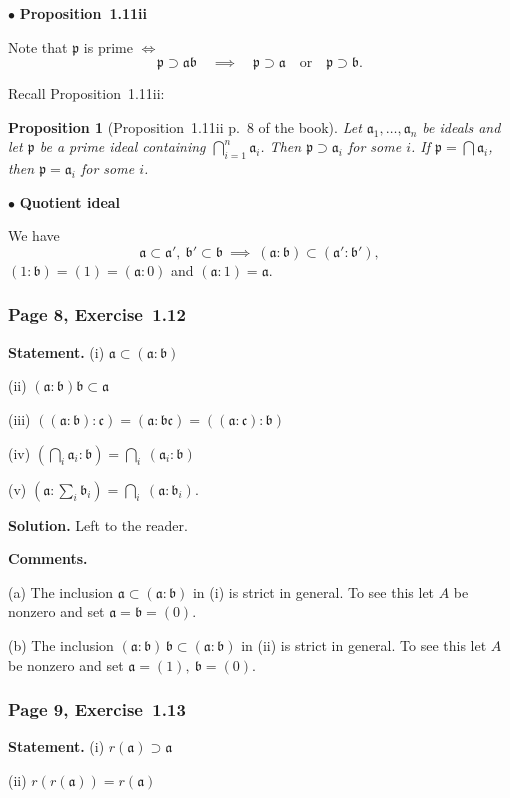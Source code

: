 \documentclass[12pt,letterpaper]{article}%
\newcommand{\mf}{\mathfrak}
\newcommand{\aaa}{\mf a}
\newcommand{\bbb}{\mf b}
\newcommand{\ccc}{\mf c}
\newcommand{\ppp}{\mf p}
\newcommand{\bu}{\bullet}
\newcommand{\nn}{\noindent}
\newtheorem{prop}[thm]{Proposition}
\begin{document}
\nn$\bu$ \textbf{Proposition~1.11ii}%

\nn Note that $\ppp$ is prime $\iff$
$$
\ppp\supset\aaa\bbb\quad\implies\quad\ppp\supset\aaa\quad\text{or}\quad\ppp\supset\bbb.
$$

Recall Proposition~1.11ii:

\begin{prop}[Proposition~1.11ii p.~8 of the book]\label{p1.11ii}
Let $\aaa_1,\dots,\aaa_n$ be ideals and let $\ppp$ be a prime ideal containing $\bigcap_{i=1}^n\aaa_i$. Then $\ppp\supset\aaa_i$ for some $i$. If $\ppp=\bigcap\aaa_i$, then $\ppp=\aaa_i$ for some $i$.
\end{prop}

\nn$\bu$ \textbf{Quotient ideal}%

\nn We have 
$$
\aaa\subset\aaa',\ \bbb'\subset\bbb\ \implies\ (\aaa:\bbb)\subset(\aaa':\bbb'),
$$ 
$(1:\bbb)=(1)=(\aaa:0)$ and $(\aaa:1)=\aaa$. 

\subsubsection{Page 8, Exercise~1.12}%

\textbf{Statement.} (i) $\aaa\subset(\aaa:\bbb)$ 

\nn(ii) $(\aaa:\bbb)\bbb\subset\aaa$

\nn(iii) $((\aaa:\bbb):\ccc)=(\aaa:\bbb\ccc )=((\aaa:\ccc):\bbb)$

\nn(iv) $\left(\bigcap_i\aaa_i:\bbb\right)=\bigcap_i\ (\aaa_i:\bbb)$

\nn(v) $\left(\aaa:\sum_i\bbb_i\right)=\bigcap_i\ (\aaa:\bbb_i)$.

\nn\textbf{Solution.} Left to the reader.%

\nn\textbf{Comments.}

\nn(a) The inclusion $\aaa\subset(\aaa:\bbb)$ in (i) is strict in general. To see this let $A$ be nonzero and set $\aaa=\bbb=(0)$.

\nn(b) The inclusion $(\aaa\!:\!\bbb)\,\bbb\subset(\aaa:\bbb)$ in (ii) is strict in general. To see this let $A$ be nonzero and set $\aaa=(1),\ \bbb=(0)$.

\subsubsection{Page 9, Exercise~1.13}%

\textbf{Statement.} (i) $r(\aaa)\supset\aaa$

\nn(ii) $r(r(\aaa))=r(\aaa)$
\end{document}
